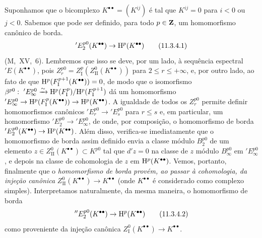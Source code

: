 \begin{env}[11.3.4]
\label{0.11.3.4}
Suponhamos que o bicomplexo $K^{\bullet\bullet}=(K^{ij})$ é tal que $K^{ij}=0$ para $i<0$ ou $j<0$.
Sabemos que pode ser definido, para todo $p\in\mathbf{Z}$, um homomorfismo canônico de borda.
\[
\label{0.11.3.4.1}
  'E_2^{p0}(K^{\bullet\bullet})
  \rightarrow \HH^{p}(K^{\bullet\bullet})
\tag{11.3.4.1}
\]
(M,~XV,~6).
Lembremos que isso se deve, por um lado, à sequência espectral
$'E(K^{\bullet\bullet})$, pois $Z_r^{p0}=Z_{\mathrm{I}}^{p}(Z_{\mathrm{II}}^{0}(K^{\bullet\bullet}))$ para $2\leq r \leq +\infty$, e, por outro lado, ao fato de que $\mathrm{H}^{p}(F_\mathrm{I}^{p+1}(K^{\bullet\bullet})) = 0$, de modo que o isomorfismo $\beta^{p0}:\ 'E_\infty^{p0} \xrightarrow{\sim} \mathrm{H}^{p}(F_\mathrm{I}^p)/\mathrm{H}^{p}(F_\mathrm{I}^{p+1})$ dá um homomorfismo $'E_\infty^{p0} \rightarrow \mathrm{H}^{p}(F_\mathrm{I}^p(K^{\bullet\bullet})) \rightarrow \mathrm{H}^{p}(K^{\bullet\bullet})$.
A igualdade de todos os $Z_r^{p0}$ permite definir homomorfismos canônicos $'E_r^{p0} \rightarrow 'E_s^{p0}$ para $r \leq s$ e, em particular, um homomorfismo $'E_2^{p0} \rightarrow 'E_\infty^{p0}$, de onde, por composição, o homomorfismo de borda $'E_2^{p0}(K^{\bullet\bullet}) \rightarrow \mathrm{H}^{p}(K^{\bullet\bullet})$.
Além disso, verifica-se imediatamente que o homomorfismo de borda assim definido envia a classe módulo $B_2^{p0}$ de um elemento $z\in Z_\mathrm{II}^0(K^{\bullet\bullet})\subset K^{p0}$ tal que $d'z=0$ na classe de $z$ módulo $B_\infty^{p0}$ em $'E_\infty^{p0}$, e depois na classe de cohomologia de $z$ em $\mathrm{H}^p(K^{\bullet\bullet})$.
Vemos, portanto, finalmente que o \emph{homomorfismo de borda}  \emph{provém, ao passar à cohomologia, da injeção canônica} $Z_\mathrm{II}^0(K^{\bullet\bullet}) \rightarrow K^{\bullet\bullet}$ (onde $K^{\bullet\bullet}$ é considerado como complexo simples).
Interpretamos naturalmente, da mesma maneira, o homomorfismo de borda
\[
\label{0.11.3.4.2}
  ''E_2^{p0}(K^{\bullet\bullet})
  \rightarrow \HH^{p}(K^{\bullet\bullet})
\tag{11.3.4.2}
\]
como proveniente da injeção canônica $Z_\mathrm{I}^0(K^{\bullet\bullet}) \rightarrow K^{\bullet\bullet}$.
\end{env}

